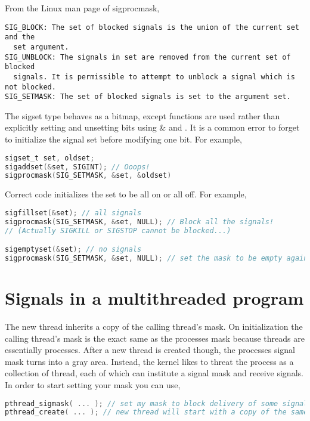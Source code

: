 From the Linux man page of sigprocmask,

\begin{verbatim}
SIG_BLOCK: The set of blocked signals is the union of the current set and the
  set argument.
SIG_UNBLOCK: The signals in set are removed from the current set of blocked
  signals. It is permissible to attempt to unblock a signal which is not blocked.
SIG_SETMASK: The set of blocked signals is set to the argument set.
\end{verbatim}

The sigset type behaves as a bitmap, except functions are used rather than explicitly setting and unsetting bits using \& and \textbar{}. It is a common error to forget to initialize the signal set before modifying one bit. For example,

\begin{lstlisting}[language=C]
sigset_t set, oldset;
sigaddset(&set, SIGINT); // Ooops!
sigprocmask(SIG_SETMASK, &set, &oldset)
\end{lstlisting}

Correct code initializes the set to be all on or all off. For example,

\begin{lstlisting}[language=C]
sigfillset(&set); // all signals
sigprocmask(SIG_SETMASK, &set, NULL); // Block all the signals!
// (Actually SIGKILL or SIGSTOP cannot be blocked...)

sigemptyset(&set); // no signals
sigprocmask(SIG_SETMASK, &set, NULL); // set the mask to be empty again
\end{lstlisting}


\section{Signals in a multithreaded program}

The new thread inherits a copy of the calling thread's mask. On initialization the calling thread's mask is the exact same as the processes mask because threads are essentially processes. After a new thread is created though, the processes signal mask turns into a gray area. Instead, the kernel likes to threat the process as a collection of thread, each of which can institute a signal mask and receive signals. In order to start setting your mask you can use,

\begin{lstlisting}[language=C]
pthread_sigmask( ... ); // set my mask to block delivery of some signals
pthread_create( ... ); // new thread will start with a copy of the same mask
\end{lstlisting}

